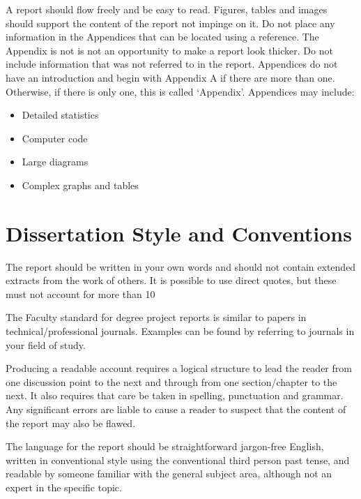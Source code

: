\documentclass{BCUReport}
\begin{document}
\begin{appendices}
    A report should flow freely and be easy to read.  Figures, tables and images should support the content of the report not impinge on it. Do not place any information in the Appendices that can be located using a reference. The Appendix is not is not an opportunity to make a report look thicker.  Do not include information that was not referred to in the report. Appendices do not have an introduction and begin with Appendix A if there are more than one. Otherwise, if there is only one, this is called ‘Appendix’. Appendices may include:
        
    \begin{itemize}
        \item Detailed statistics
        \item Computer code
        \item Large diagrams
        \item Complex graphs and tables
    \end{itemize}

\section{Dissertation Style and Conventions}
\label{app:Stuff}
    The report should be written in your own words and should not contain extended extracts from the work of others. It is possible to use direct quotes, but these must not account for more than 10%
        
    The Faculty standard for degree project reports is similar to papers in technical/professional journals. Examples can be found by referring to journals in your field of study.
    
    Producing a readable account requires a logical structure to lead the reader from one discussion point to the next and through from one section/chapter to the next. It also requires that care be taken in spelling, punctuation and grammar. Any significant errors are liable to cause a reader to suspect that the content of the report may also be flawed.
        
    The language for the report should be straightforward jargon-free English, written in conventional style using the conventional third person past tense, and readable by someone familiar with the general subject area, although not an expert in the specific topic.
        

\end{appendices}
\end{document}
